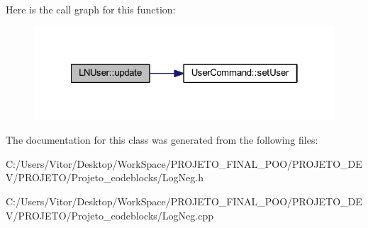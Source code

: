 Here is the call graph for this function\-:\nopagebreak
\begin{figure}[H]
\begin{center}
\leavevmode
\includegraphics[width=322pt]{class_l_n_user_a4093083f84eec431151c7315b5064b88_cgraph}
\end{center}
\end{figure}




The documentation for this class was generated from the following files\-:\begin{DoxyCompactItemize}
\item 
C\-:/\-Users/\-Vitor/\-Desktop/\-Work\-Space/\-P\-R\-O\-J\-E\-T\-O\-\_\-\-F\-I\-N\-A\-L\-\_\-\-P\-O\-O/\-P\-R\-O\-J\-E\-T\-O\-\_\-\-D\-E\-V/\-P\-R\-O\-J\-E\-T\-O/\-Projeto\-\_\-codeblocks/Log\-Neg.\-h\item 
C\-:/\-Users/\-Vitor/\-Desktop/\-Work\-Space/\-P\-R\-O\-J\-E\-T\-O\-\_\-\-F\-I\-N\-A\-L\-\_\-\-P\-O\-O/\-P\-R\-O\-J\-E\-T\-O\-\_\-\-D\-E\-V/\-P\-R\-O\-J\-E\-T\-O/\-Projeto\-\_\-codeblocks/Log\-Neg.\-cpp\end{DoxyCompactItemize}
